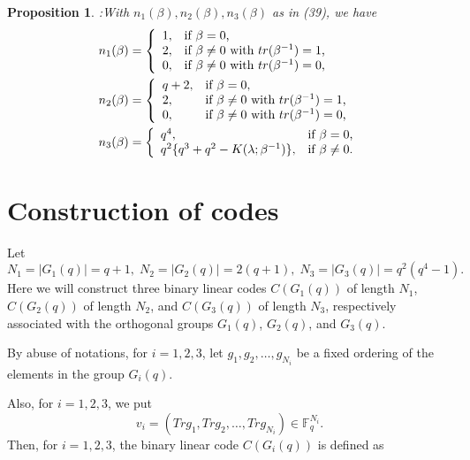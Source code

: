 \documentclass[a4,12pt]{elsart}
\newtheorem{proposition}[theorem]{Proposition}
\begin{document}
\begin{proposition}:\label{J} With $n_1(\beta), n_2(\beta), n_3(\beta)$ as in
(39), we have
\begin{align}
& n_1(\beta) = \left\{\begin{array}{ll}
    1, & \hbox{if $\beta = 0$,} \\
    2, & \hbox{if $\beta \neq 0$ with $tr(\beta^{-1}) = 1$,} \\
    0, & \hbox{if $\beta \neq 0$ with $tr(\beta^{-1}) = 0$,} \\
\end{array}\right. \\
& n_2(\beta) = \left\{\begin{array}{ll}
    q+2, & \hbox{if $\beta = 0$,} \\
    2, & \hbox{if $\beta \neq 0$ with $tr(\beta^{-1}) = 1$,} \\
    0, & \hbox{if $\beta \neq 0$ with $tr(\beta^{-1}) = 0$,} \\
\end{array}\right.\\
& n_3(\beta) = \left\{\begin{array}{ll}
    q^4, & \hbox{if $\beta = 0$,} \\
    q^2\{q^3+q^2-K(\lambda;\beta^{-1})\}, & \hbox{if $\beta \neq 0$.} \\
\end{array}\right.
\end{align}
\end{proposition}

\section{Construction of codes}
Let
\begin{equation}\label{a43}
 N_1=|G_1(q)|=q+1, \; N_2=|G_2(q)|=2(q+1),\; N_3=|G_3(q)|=q^2(q^4-1).
\end{equation}
Here we will construct three binary linear codes $C(G_1(q))$ of
length $N_1$, $C(G_2(q))$ of length $N_2$, and $C(G_3(q))$ of length
$N_3$, respectively associated with the orthogonal groups $G_1(q)$,
$G_2(q)$, and $G_3(q)$.

By abuse of notations, for  $i=1,2,3$, let $g_1, g_2,\ldots,g_{N_i}$
be a fixed ordering of the elements in the group $G_i(q)$.

Also, for $i=1,2,3$, we put
\[
v_i = (Trg_1,Trg_2,\ldots,Trg_{N_i}) \in {\mathbb{F}}_q^{N_i}.
\]
Then, for  $i=1,2,3$, the binary linear code $C(G_i(q))$ is defined
as
\end{document}
